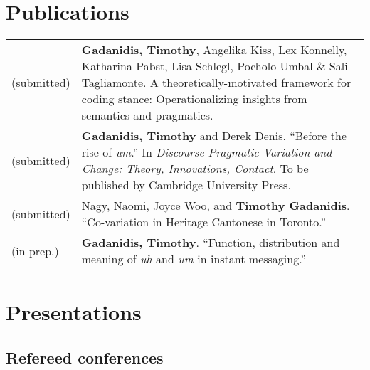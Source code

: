 \documentclass[letterpaper]{article}
\begin{document}

\section*{Publications}
\begin{longtable}{p{}p{}}
    (submitted) &\textbf{Gadanidis, Timothy}, Angelika Kiss, Lex Konnelly,
    Katharina Pabst, Lisa Schlegl, Poc\-holo Umbal \& Sali Tagliamonte. A
    theoretically-motivated framework for coding stance: Operationalizing
    insights from semantics and pragmatics. \\
    (submitted) &\textbf{Gadanidis, Timothy} and Derek Denis. ``Before the rise
    of \emph{um}.'' In \textit{Discourse Pragmatic Variation and Change: Theory,
    Innovations, Contact}. To be published by Cambridge University Press. \\
    (submitted) &Nagy, Naomi, Joyce Woo, and \textbf{Timothy Gadanidis}.
    ``Co-variation in Heritage Cantonese in Toronto.'' \\
    (in prep.) &\textbf{Gadanidis, Timothy}. ``Function, distribution and
    meaning of \emph{uh} and \emph{um} in instant messaging.'' \\
\end{longtable}

\section*{Presentations}

\subsection*{Refereed conferences}
\end{document}
